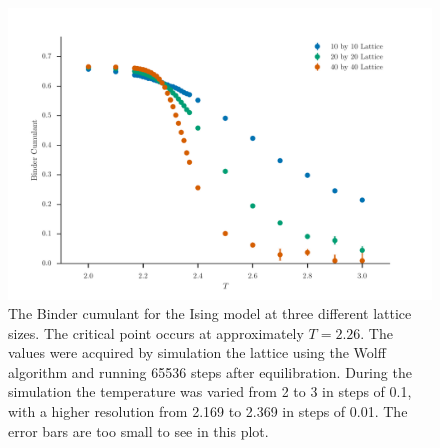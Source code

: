 \documentclass[11pt, a4paper]{report} %
\begin{document}
\begin{figure}[htb]
	\includegraphics[width=\linewidth]{wolff_binder_cumulant.pdf}
	\caption{The Binder cumulant for the Ising model at three different lattice sizes. The critical point occurs at approximately \(T = 2.26\). The values were acquired by simulation the lattice using the Wolff algorithm and running 65536 steps after equilibration. During the simulation the temperature was varied from 2 to 3 in steps of 0.1, with a higher resolution from 2.169 to 2.369 in steps of 0.01. The error bars are too small to see in this plot.}
	\label{fig:ising_binder_cumulant}
\end{figure}
\end{document}
